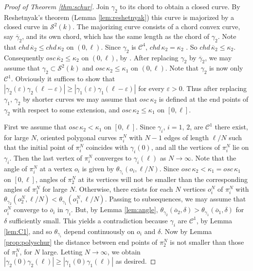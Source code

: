 \documentclass[11pt]{amsart}
\theoremstyle{definition}
\newcommand{\ol}{\overline}
\newcommand{\C}{\mathcal{C}}
\renewcommand{\epsilon}{\varepsilon}
\begin{document}
\begin{proof}[Proof of Theorem \ref{thm:schur}]
Join  $\gamma_2$ to its chord to obtain a closed curve. By Reshetnyak's theorem (Lemma \ref{lem:reshetnyak}) this curve is majorized by  a closed curve in $\mathcal{S}^2(k)$. The majorizing curve consists of a chord convex curve, say $\ol\gamma_2$, and its own chord, which has the same length as the chord of $\gamma_2$. Note that  $chd\,\ol\kappa_2\leq chd\,\kappa_2$ on $(0,\ell)$. Since $\gamma_2$ is $\C^4$, $chd\,\kappa_2=\kappa_2$ \cite{alexander-bishop1996}. So $chd\,\ol\kappa_2\leq \kappa_2$. Consequently $osc\,\ol\kappa_2\leq \kappa_2$ on $(0,\ell)$, by \cite[Thm. 3.1]{alexander-bishop1996}. After replacing $\gamma_2$ by $\ol\gamma_2$, we may assume that $\gamma_2\subset\mathcal{S}^2(k)$ and ${osc\,\kappa_2}\leq\kappa_1$ on $(0,\ell)$. Note that $\gamma_2$ is now only $\C^1$.
Obviously it suffices to show that $|\gamma_2(\epsilon)\gamma_2(\ell-\epsilon)|\geq |\gamma_1(\epsilon)\gamma_1(\ell-\epsilon)|$ for every $\epsilon>0$. Thus after replacing $\gamma_1$, $\gamma_2$ by shorter curves we may assume that $osc\,\kappa_2$ is defined at the end points of $\gamma_2$ with respect to some extension, and $osc\,\kappa_2\leq \kappa_1$ on $[0,\ell]$. 


First we assume that ${osc\,\kappa_2}<\kappa_1$ on $[0,\ell]$. Since $\gamma_i$, $i=1$, $2$, are $\C^1$ there exist, for large $N$, oriented polygonal curves $\pi_i^N$  with $N-1$ edges of length $\ell/N$ such that the initial point of $\pi_i^N$ coincides with $\gamma_i(0)$, and all the vertices of $\pi_i^N$ lie on $\gamma_i$. Then the last vertex of $\pi_i^N$ converges to $\gamma_i(\ell)$ as $N\to\infty$. Note that the angle of $\pi_i^N$ at a vertex $o_i$ is given by $\theta_{\gamma_i}(o_i,\ell/N)$.
Since ${osc\,\kappa_2}<\kappa_1={osc\,\kappa_1}$ on $[0,\ell]$,  angles of $\pi_2^N$ at its vertices will not be smaller than the corresponding angles of $\pi_1^N$ for large $N$. Otherwise, there exists for each $N$ vertices $o_i^N$ of $\pi_i^N$ with $\theta_{\gamma_2}(o_2^N,\ell/N)<\theta_{\gamma_1}(o_1^N,\ell/N)$.  Passing to subsequences, we may assume that $o_i^N$  converge to $\ol o_i$ in $\gamma_i$. But, by Lemma \ref{lem:angle}, $\theta_{\gamma_2}(\ol o_2,\delta)>\theta_{\gamma_1}(\ol o_1,\delta)$ for $\delta$ sufficiently small. This yields a contradiction because  $\gamma_i$ are $\C^1$, by Lemma \ref{lem:C1}, and so $\theta_{\gamma_i}$ depend continuously on $o_i$ and $\delta$. Now by Lemma \ref{prop:polyschur} the distance between end points of $\pi_2^N$ is not smaller than those of $\pi_1^N$, for $N$ large. Letting $N\to\infty$, we obtain $|\gamma_2(0)\gamma_2(\ell)|\geq |\gamma_1(0)\gamma_1(\ell)|$ as desired.



\end{proof}
\end{document}
